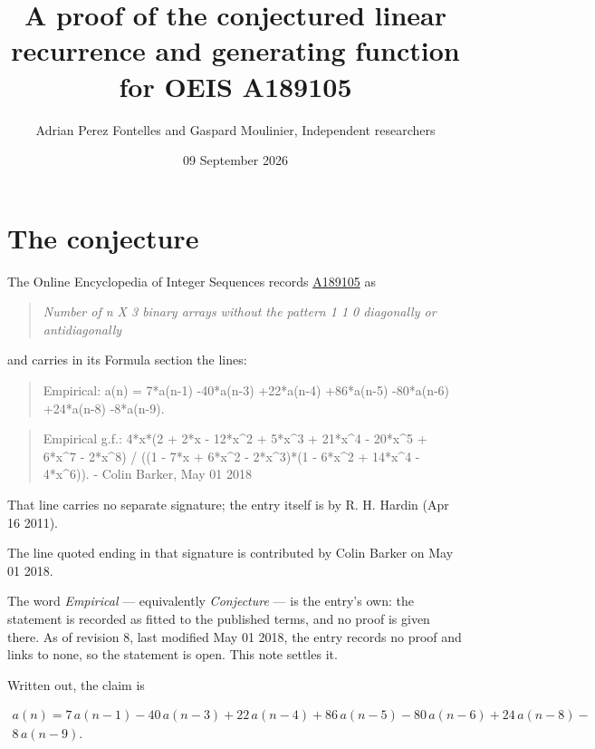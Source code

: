 \documentclass[11pt]{article}
\title{A proof of the conjectured linear recurrence and generating function for OEIS A189105}
\author{Adrian Perez Fontelles and Gaspard Moulinier, Independent researchers}
\date{09 September 2026}
\theoremstyle{definition}
\begin{document}
\maketitle
\section{The conjecture}

The Online Encyclopedia of Integer Sequences records \href{https://oeis.org/A189105}{A189105} as

\begin{quote}\itshape Number of n X 3 binary arrays without the pattern 1 1 0 diagonally or antidiagonally\end{quote}

and carries in its Formula section the lines:

\begin{quote}\ttfamily Empirical: a(n) = 7*a(n-1) -40*a(n-3) +22*a(n-4) +86*a(n-5) -80*a(n-6) +24*a(n-8) -8*a(n-9).\end{quote}

\begin{quote}\ttfamily Empirical g.f.: 4*x*(2 + 2*x - 12*x\textasciicircum{}2 + 5*x\textasciicircum{}3 + 21*x\textasciicircum{}4 - 20*x\textasciicircum{}5 + 6*x\textasciicircum{}7 - 2*x\textasciicircum{}8) / ((1 - 7*x + 6*x\textasciicircum{}2 - 2*x\textasciicircum{}3)*(1 - 6*x\textasciicircum{}2 + 14*x\textasciicircum{}4 - 4*x\textasciicircum{}6)). - Colin Barker, May 01 2018\end{quote}

That line carries no separate signature; the entry itself is by R. H. Hardin (Apr 16 2011).

The line quoted ending in that signature is contributed by Colin Barker on May 01 2018.

The word {\itshape Empirical} --- equivalently {\itshape Conjecture} --- is the entry's own: the statement is recorded as fitted to the published terms, and no proof is given there. As of revision 8, last modified May 01 2018, the entry records no proof and links to none, so the statement is open. This note settles it.

Written out, the claim is

\begin{multline*} a(n) = 7\,a(n-1) - 40\,a(n-3) + 22\,a(n-4) + 86\,a(n-5) - 80\,a(n-6) + 24\,a(n-8) - \\ 8\,a(n-9). \end{multline*}
\end{document}
